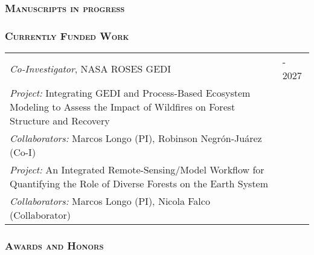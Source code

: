 \documentclass[10pt,english]{article}
\providecommand{\tabularnewline}{\\}
\begin{document}

\vspace{1ex}


\subsubsection*{\textsc{Manuscripts in progress}}

\setlength{\LTpre}{0pt}
\setlength{\LTpost}{2ex}
\setlength{\extrarowheight}{0.25ex}


\vspace{1ex}


\subsubsection*{\textsc{Currently Funded Work}}
\vspace{-0.5ex}

\renewcommand{\arraystretch}{1.2}
\begin{tabularx}{\textwidth}{@{}>{\raggedright}p{5in} >{\raggedleft}X@{}}

\emph{Co-Investigator}, NASA ROSES GEDI & 2024 - 2027 \tabularnewline
\addtolength{\leftskip}{5ex}\emph{Project:} Integrating GEDI and Process-Based Ecosystem Modeling to Assess the Impact of Wildfires on Forest Structure and Recovery & \tabularnewline
\addtolength{\leftskip}{5ex}\emph{Collaborators:} Marcos Longo (PI), Robinson Negr\'{o}n-Ju\'{a}rez (Co-I) & \tabularnewline

\addtolength{\leftskip}{5ex}\emph{Project:} An Integrated Remote-Sensing/Model Workflow for Quantifying the Role of Diverse Forests on the Earth System & \tabularnewline
\addtolength{\leftskip}{5ex}\emph{Collaborators:} Marcos Longo (PI), Nicola Falco (Collaborator) & \tabularnewline

\end{tabularx}

\vspace{1ex}


\subsubsection*{\textsc{Awards and Honors}}
\end{document}
